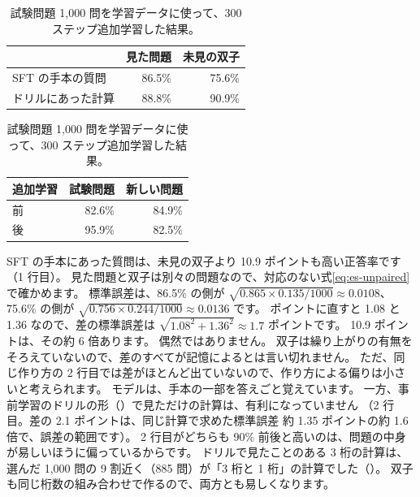 \begin{table}[tbp]
\small
\begin{minipage}[t]{0.5\linewidth}
\centering
\caption{見た問題と、未見の双子の正答率（3 桁の問題を 1,000 問ずつ）。見た問題は学習データの側から集め、双子は数だけを変えて作った。}
\label{tab:es-contam}
\begin{tabular}{@{}lrr@{}}
\toprule
& 見た問題 & 未見の双子 \\
\midrule
SFT の手本の質問 & 86.5\% & 75.6\% \\
ドリルにあった計算 & 88.8\% & 90.9\% \\
\bottomrule
\end{tabular}
\end{minipage}\hfill
\begin{minipage}[t]{0.46\linewidth}
\centering
\caption{試験問題 1,000 問を学習データに使って、300 ステップ追加学習した結果。}
\label{tab:es-leak}
\begin{tabular}{@{}lrr@{}}
\toprule
追加学習 & 試験問題 & 新しい問題 \\
\midrule
前 & 82.6\% & 84.9\% \\
後 & 95.9\% & 82.5\% \\
\bottomrule
\end{tabular}
\end{minipage}
\end{table}

SFT の手本にあった質問は、未見の双子より 10.9 ポイントも高い正答率です（1 行目）。
見た問題と双子は別々の問題なので、対応のない式\eqref{eq:es-unpaired}で確かめます。
標準誤差は、86.5\% の側が $\sqrt{0.865\times0.135/1000}\approx0.0108$、75.6\% の側が $\sqrt{0.756\times0.244/1000}\approx0.0136$ です。
ポイントに直すと 1.08 と 1.36 なので、差の標準誤差は $\sqrt{1.08^2+1.36^2}\approx1.7$ ポイントです。
10.9 ポイントは、その約 6 倍あります。
偶然ではありません。
双子は繰り上がりの有無をそろえていないので、差のすべてが記憶によるとは言い切れません。
ただ、同じ作り方の 2 行目では差がほとんど出ていないので、作り方による偏りは小さいと考えられます。
モデルは、手本の一部を答えごと覚えています。
一方、事前学習のドリルの形（）で見ただけの計算は、有利になっていません
（2 行目。差の 2.1 ポイントは、同じ計算で求めた標準誤差 約 1.35 ポイントの約 1.6 倍で、誤差の範囲です）。
2 行目がどちらも 90\% 前後と高いのは、問題の中身が易しいほうに偏っているからです。
ドリルで見たことのある 3 桁の計算は、選んだ 1,000 問の 9 割近く（885 問）が「3 桁と 1 桁」の計算でした（）。
双子も同じ桁数の組み合わせで作るので、両方とも易しくなります。


